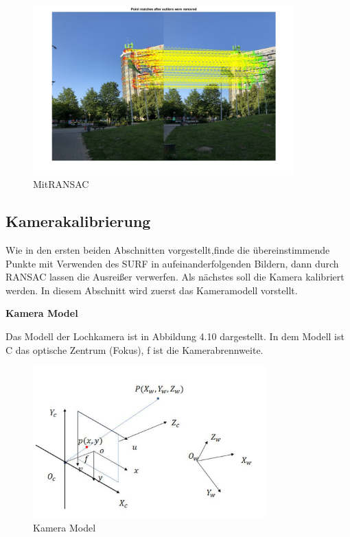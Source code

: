 \begin{figure}[H]
 \centering 
 \includegraphics[keepaspectratio,width=0.9\textwidth]{images/4_ZweiteErfahrung/RANSAC/MitRANSAC.pdf}
 \caption{MitRANSAC}
 \label{fig:MitRANSAC}
\end{figure} 


\subsection{Kamerakalibrierung}

Wie in den ersten beiden Abschnitten vorgestellt,finde  die übereinstimmende Punkte mit Verwenden des SURF in aufeinanderfolgenden Bildern, dann durch RANSAC lassen die Ausreißer verwerfen. Als nächstes soll die Kamera kalibriert werden. In diesem Abschnitt wird zuerst das Kameramodell vorstellt.

\textbf{Kamera Model}

Das Modell der Lochkamera ist in Abbildung 4.10 dargestellt. In dem Modell ist C das optische Zentrum (Fokus), f ist die Kamerabrennweite.

\begin{figure}[htb]
 \centering 
 \includegraphics[keepaspectratio,width=0.8\textwidth]{images/4_ZweiteErfahrung/Kamera/cameramodel.pdf}
 \caption{Kamera Model}
 \label{fig:cameramodel}
\end{figure} 

